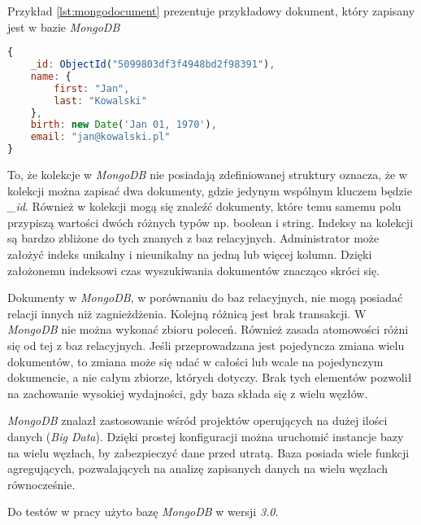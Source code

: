 Przykład \ref{lst:mongodocument} prezentuje przykładowy dokument, który zapisany jest w bazie \textsl{MongoDB}

\begin{lstlisting}[language=JavaScript,caption=Przykład dokumentu zapisanego w bazie MongoDB,label={lst:mongodocument}]
{
    _id: ObjectId("5099803df3f4948bd2f98391"),
    name: { 
        first: "Jan", 
        last: "Kowalski" 
    },
    birth: new Date('Jan 01, 1970'),
    email: "jan@kowalski.pl"
}
\end{lstlisting}

To, że kolekcje w \textsl{MongoDB} nie posiadają zdefiniowanej struktury oznacza, że w kolekcji można zapisać dwa dokumenty, gdzie jedynym wspólnym kluczem będzie \textsl{\_id}. Również w kolekcji mogą się znaleźć dokumenty, które temu samemu polu przypiszą wartości dwóch różnych typów np. boolean i string. Indeksy na kolekcji są bardzo zbliżone do tych znanych z baz relacyjnych. Administrator może założyć indeks unikalny i nieunikalny na jedną lub więcej kolumn. Dzięki założonemu indeksowi czas wyszukiwania dokumentów znacząco skróci się.

Dokumenty w \textsl{MongoDB}, w porównaniu do baz relacyjnych, nie mogą posiadać relacji innych niż zagnieżdżenia. Kolejną różnicą jest brak transakcji. W \textsl{MongoDB} nie można wykonać zbioru poleceń. Również zasada atomowości różni się od tej z baz relacyjnych. Jeśli przeprowadzana jest pojedyncza zmiana wielu dokumentów, to zmiana może się udać w całości lub wcale na pojedynczym dokumencie, a nie całym zbiorze, których dotyczy. Brak tych elementów pozwolił na zachowanie wysokiej wydajności, gdy baza składa się z wielu węzłów.

\textsl{MongoDB} znalazł zastosowanie wśród projektów operujących na dużej ilości danych (\textsl{Big Data}). Dzięki prostej konfiguracji można uruchomić instancje bazy na wielu węzłach, by zabezpieczyć dane przed utratą. Baza posiada wiele funkcji agregujących, pozwalających na analizę zapisanych danych na wielu węzłach równocześnie.

Do testów w pracy użyto bazę \textsl{MongoDB} w wersji \textsl{3.0}.


